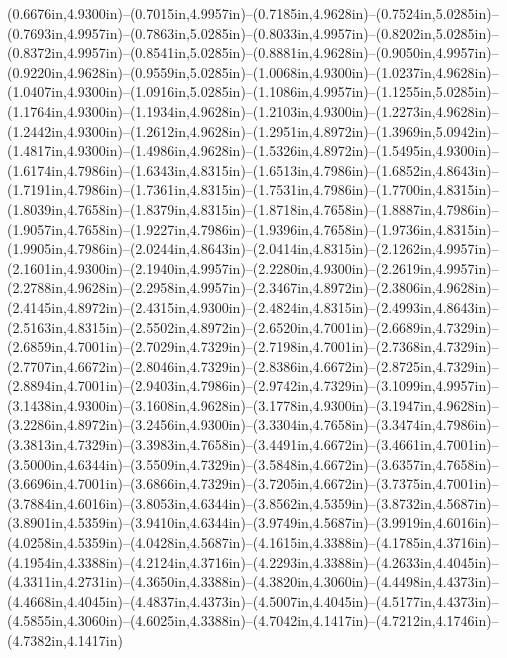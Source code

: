 (0.6676in,4.9300in)--(0.7015in,4.9957in)--(0.7185in,4.9628in)--(0.7524in,5.0285in)--(0.7693in,4.9957in)--(0.7863in,5.0285in)--(0.8033in,4.9957in)--(0.8202in,5.0285in)--(0.8372in,4.9957in)--(0.8541in,5.0285in)--(0.8881in,4.9628in)--(0.9050in,4.9957in)--(0.9220in,4.9628in)--(0.9559in,5.0285in)--(1.0068in,4.9300in)--(1.0237in,4.9628in)--(1.0407in,4.9300in)--(1.0916in,5.0285in)--(1.1086in,4.9957in)--(1.1255in,5.0285in)--(1.1764in,4.9300in)--(1.1934in,4.9628in)--(1.2103in,4.9300in)--(1.2273in,4.9628in)--(1.2442in,4.9300in)--(1.2612in,4.9628in)--(1.2951in,4.8972in)--(1.3969in,5.0942in)--(1.4817in,4.9300in)--(1.4986in,4.9628in)--(1.5326in,4.8972in)--(1.5495in,4.9300in)--(1.6174in,4.7986in)--(1.6343in,4.8315in)--(1.6513in,4.7986in)--(1.6852in,4.8643in)--(1.7191in,4.7986in)--(1.7361in,4.8315in)--(1.7531in,4.7986in)--(1.7700in,4.8315in)--(1.8039in,4.7658in)--(1.8379in,4.8315in)--(1.8718in,4.7658in)--(1.8887in,4.7986in)--(1.9057in,4.7658in)--(1.9227in,4.7986in)--(1.9396in,4.7658in)--(1.9736in,4.8315in)--(1.9905in,4.7986in)--(2.0244in,4.8643in)--(2.0414in,4.8315in)--(2.1262in,4.9957in)--(2.1601in,4.9300in)--(2.1940in,4.9957in)--(2.2280in,4.9300in)--(2.2619in,4.9957in)--(2.2788in,4.9628in)--(2.2958in,4.9957in)--(2.3467in,4.8972in)--(2.3806in,4.9628in)--(2.4145in,4.8972in)--(2.4315in,4.9300in)--(2.4824in,4.8315in)--(2.4993in,4.8643in)--(2.5163in,4.8315in)--(2.5502in,4.8972in)--(2.6520in,4.7001in)--(2.6689in,4.7329in)--(2.6859in,4.7001in)--(2.7029in,4.7329in)--(2.7198in,4.7001in)--(2.7368in,4.7329in)--(2.7707in,4.6672in)--(2.8046in,4.7329in)--(2.8386in,4.6672in)--(2.8725in,4.7329in)--(2.8894in,4.7001in)--(2.9403in,4.7986in)--(2.9742in,4.7329in)--(3.1099in,4.9957in)--(3.1438in,4.9300in)--(3.1608in,4.9628in)--(3.1778in,4.9300in)--(3.1947in,4.9628in)--(3.2286in,4.8972in)--(3.2456in,4.9300in)--(3.3304in,4.7658in)--(3.3474in,4.7986in)--(3.3813in,4.7329in)--(3.3983in,4.7658in)--(3.4491in,4.6672in)--(3.4661in,4.7001in)--(3.5000in,4.6344in)--(3.5509in,4.7329in)--(3.5848in,4.6672in)--(3.6357in,4.7658in)--(3.6696in,4.7001in)--(3.6866in,4.7329in)--(3.7205in,4.6672in)--(3.7375in,4.7001in)--(3.7884in,4.6016in)--(3.8053in,4.6344in)--(3.8562in,4.5359in)--(3.8732in,4.5687in)--(3.8901in,4.5359in)--(3.9410in,4.6344in)--(3.9749in,4.5687in)--(3.9919in,4.6016in)--(4.0258in,4.5359in)--(4.0428in,4.5687in)--(4.1615in,4.3388in)--(4.1785in,4.3716in)--(4.1954in,4.3388in)--(4.2124in,4.3716in)--(4.2293in,4.3388in)--(4.2633in,4.4045in)--(4.3311in,4.2731in)--(4.3650in,4.3388in)--(4.3820in,4.3060in)--(4.4498in,4.4373in)--(4.4668in,4.4045in)--(4.4837in,4.4373in)--(4.5007in,4.4045in)--(4.5177in,4.4373in)--(4.5855in,4.3060in)--(4.6025in,4.3388in)--(4.7042in,4.1417in)--(4.7212in,4.1746in)--(4.7382in,4.1417in) 